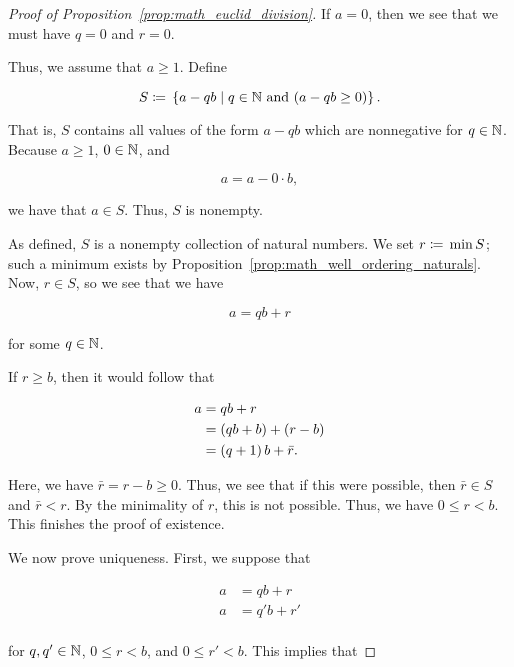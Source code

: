 \begin{proof}[Proof of Proposition~\ref{prop:math_euclid_division}]
If $a=0$, then we see that we must have $q=0$ and $r=0$.

Thus, we assume that $a\ge1$.
Define

\begin{equation}
    S \coloneqq{} \left\{ a - qb \mid q\in\mathbb{N} \text{ and } (a-qb\ge0) \right\}.
\end{equation}

\noindent
That is, $S$ contains all values of the form $a-qb$ which are nonnegative
for $q\in\mathbb{N}$.
Because $a\ge1$, $0\in\mathbb{N}$, and

\begin{equation}
    a = a - 0\cdot b,
\end{equation}

\noindent
we have that $a\in S$.
Thus, $S$ is nonempty.

As defined, $S$ is a nonempty collection of natural numbers.
We set $r \coloneqq{} \min S$;
such a minimum exists by Proposition~\ref{prop:math_well_ordering_naturals}.
Now, $r\in S$, so we see that we have

\begin{equation}
    a = qb + r
\end{equation}

\noindent
for some $q\in\mathbb{N}$.

If $r\ge b$, then it would follow that

\begin{align}
    a &= qb + r \nonumber\\
        &= \left( qb + b \right) + \left( r-b \right) \nonumber\\
        &= \left( q+1 \right)b + \bar{r}.
\end{align}

\noindent
Here, we have $\bar{r} = r-b\ge0$.
Thus, we see that if this were possible, then $\bar{r}\in S$ and
$\bar{r} < r$.
By the minimality of $r$, this is not possible.
Thus, we have $0\le r < b$.
This finishes the proof of existence.

We now prove uniqueness.
First, we suppose that

\begin{align}
    a &= qb + r \nonumber\\
    a &= q'b + r' \nonumber\\
\end{align}

\noindent
for $q,q'\in\mathbb{N}$, $0\le r < b$, and $0\le r' < b$.
This implies that


\end{proof}
